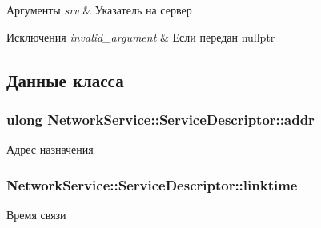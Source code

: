 \begin{DoxyParams}{Аргументы}
{\em srv} & Указатель на сервер \\
\hline
\end{DoxyParams}

\begin{DoxyExceptions}{Исключения}
{\em invalid\+\_\+argument} & Если передан nullptr \\
\hline
\end{DoxyExceptions}


\subsection{Данные класса}
\hypertarget{class_network_service_1_1_service_descriptor_a0ee74116510749afe1c60a7634d3eae7}{}
\subsubsection[{addr}]{\setlength{\rightskip}{0pt plus 5cm}ulong Network\+Service\+::\+Service\+Descriptor\+::addr\hspace{0.3cm}{\ttfamily [private]}}\label{class_network_service_1_1_service_descriptor_a0ee74116510749afe1c60a7634d3eae7}


Адрес назначения 

\hypertarget{class_network_service_1_1_service_descriptor_a08bfd17afce0cba1954d30bd76a14df4}{}
\subsubsection[{linktime}]{ Network\+Service\+::\+Service\+Descriptor\+::linktime\hspace{0.3cm}{\ttfamily [private]}}\label{class_network_service_1_1_service_descriptor_a08bfd17afce0cba1954d30bd76a14df4}


Время связи 

\hypertarget{class_network_service_1_1_service_descriptor_ad504b32ced44a75e0e02ea961d9434c4}{}
